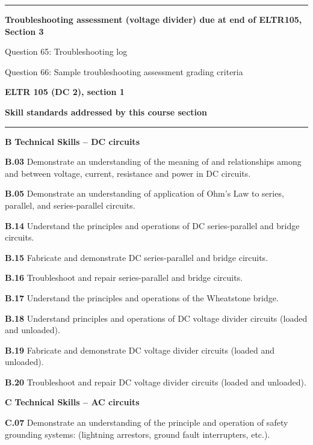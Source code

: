\vskip 10pt
\hrule \vskip 5pt
\noindent
{}

\hskip 10pt {\bf Troubleshooting assessment (voltage divider) due at end of ELTR105, Section 3}
 
\hskip 10pt Question 65: Troubleshooting log
 
\hskip 10pt Question 66: Sample troubleshooting assessment grading criteria
 
\vskip 10pt








\vfil \eject

\centerline{\bf ELTR 105 (DC 2), section 1} \bigskip 
 
\vskip 10pt

\noindent
{\bf Skill standards addressed by this course section}

\vskip 5pt

\hrule \vskip 10pt
\noindent
{}

\vskip 5pt

\medskip
\item{\bf B} {\bf Technical Skills -- DC circuits}
\item{\bf B.03} Demonstrate an understanding of the meaning of and relationships among and between voltage, current, resistance and power in DC circuits.
\item{\bf B.05} Demonstrate an understanding of application of Ohm's Law to series, parallel, and series-parallel circuits.
\item{\bf B.14} Understand the principles and operations of DC series-parallel and bridge circuits.
\item{\bf B.15} Fabricate and demonstrate DC series-parallel and bridge circuits.
\item{\bf B.16} Troubleshoot and repair series-parallel and bridge circuits.
\item{\bf B.17} Understand the principles and operations of the Wheatstone bridge.
\item{\bf B.18} Understand principles and operations of DC voltage divider circuits (loaded and unloaded).
\item{\bf B.19} Fabricate and demonstrate DC voltage divider circuits (loaded and unloaded).
\item{\bf B.20} Troubleshoot and repair DC voltage divider circuits (loaded and unloaded).
\item{\bf C} {\bf Technical Skills -- AC circuits}
\item{\bf C.07} Demonstrate an understanding of the principle and operation of safety grounding systems: (lightning arrestors, ground fault interrupters, etc.).
\medskip

